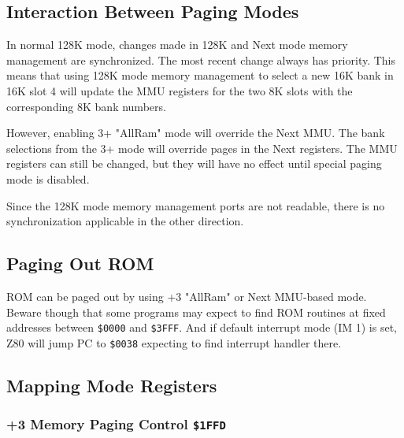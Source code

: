 \documentclass[twoside,openright,a4paper]{book}
\begin{document}
\subsection{Interaction Between Paging Modes}

In normal 128K mode, changes made in 128K and Next mode memory management are synchronized. The most recent change always has priority. This means that using 128K mode memory management to select a new 16K bank in 16K slot 4 will update the MMU registers for the two 8K slots with the corresponding 8K bank numbers.

However, enabling 3+ "AllRam" mode will override the Next MMU. The bank selections from the 3+ mode will override pages in the Next registers. The MMU registers can still be changed, but they will have no effect until special paging mode is disabled.

Since the 128K mode memory management ports are not readable, there is no synchronization applicable in the other direction.


\subsection{Paging Out ROM}

ROM can be paged out by using +3 "AllRam" or Next MMU-based mode. Beware though that some programs may expect to find ROM routines at fixed addresses between {\tt \$0000} and {\tt \$3FFF}. And if default interrupt mode (IM 1) is set, Z80 will jump PC to {\tt \$0038} expecting to find interrupt handler there.


\subsection{Mapping Mode Registers}
\label{zx_next_mappingregister}

\subsubsection{+3 Memory Paging Control {\tt \$1FFD}}
\end{document}
